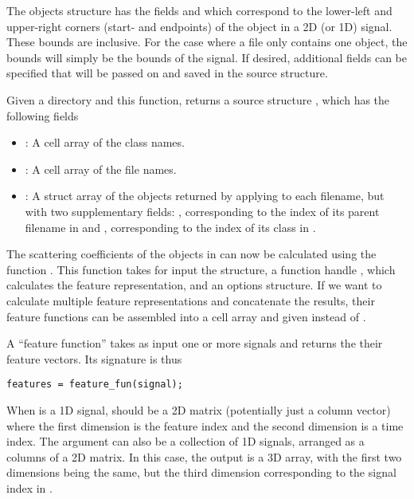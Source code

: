 \documentclass{article}
\begin{document}
The objects structure has the fields  and  which correspond to the lower-left and upper-right corners (start- and endpoints) of the object in a 2D (or 1D) signal. These bounds are inclusive. For the case where a file only contains one object, the bounds will simply be the bounds of the signal. If desired, additional fields can be specified that will be passed on and saved in the source structure.

Given a directory and this function,  returns a source structure , which has the following fields
\begin{itemize}
	\item {}: A cell array of the class names.
	\item {}: A cell array of the file names.
	\item {}: A struct array of the objects returned by applying  to each filename, but with two supplementary fields: , corresponding to the index of its parent filename in  and , corresponding to the index of its class in .
\end{itemize}

The scattering coefficients of the objects in  can now be calculated using the function . This function takes for input the  structure, a function handle , which calculates the feature representation, and an options structure. If we want to calculate multiple feature representations and concatenate the results, their feature functions can be assembled into a cell array and given instead of .

A ``feature function'' takes as input one or more signals and returns the their feature vectors. Its signature is thus
\begin{lstlisting}
features = feature_fun(signal);
\end{lstlisting}

When  is a 1D signal,  should be a 2D matrix (potentially just a column vector) where the first dimension is the feature index and the second dimension is a time index. The  argument can also be a collection of 1D signals, arranged as a columns of a 2D matrix. In this case, the output  is a 3D array, with the first two dimensions being the same, but the third dimension corresponding to the signal index in .
\end{document}
